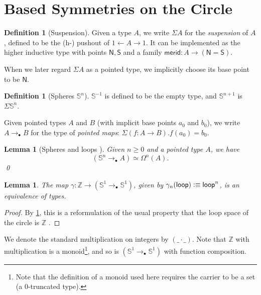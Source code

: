 \documentclass[11pt,a4paper,oneside,reqno]{amsart}
\newtheorem{lemma}[theorem]{Lemma}
\theoremstyle{definition}
\newtheorem{definition}[theorem]{Definition}
\theoremstyle{remark}
\newcommand{\Z}{\mathbb Z}
\newcommand{\sph}[1]{{\mathbb S}^{#1}}
\newcommand{\defeq}{\vcentcolon\equiv}
\newcommand{\North}{\mathsf N}
\newcommand{\South}{\mathsf S}
\newcommand{\merid}{\mathsf{merid}}
\newcommand{\pointedm}{\rightarrow_\bullet}
\newcommand{\lo}{\mathsf{loop}}
\begin{document}
\section{Based Symmetries on the Circle}

\begin{definition}[Suspension]
 Given a type $A$, we write $\Sigma A$ for the \emph{suspension} of $A$, defined to be the (h-) pushout of $1 \leftarrow A \rightarrow 1$.
 It can be implemented as the higher inductive type with points $\North, \South$ and a family $\merid : A \to (\North = \South)$.
\end{definition}

When we later regard $\Sigma A$ as a pointed type, we implicitly choose its base point to be $\North$.


\begin{definition}[Spheres $\sph n$]
 $\sph {-1}$ is defined to be the empty type, and $\sph {n+1}$ is $\Sigma \sph n$.
\end{definition}

Given pointed types $A$ and $B$ (with implicit base points $a_0$ and $b_0$), we write $A \pointedm B$ for the type of \emph{pointed maps}: $\Sigma (f : A \to B). f(a_0) = b_0$.

\begin{lemma}[{Spheres and loops \cite[iterate Lemma 6.5.4]{HoTT}}] \label{lem:sph-loops}
 Given $n \geq 0$ and a pointed type $A$, we have
 \begin{equation}
  (\sph n \pointedm A) \simeq \Omega^n(A).
 \end{equation}
 \qed
\end{lemma}

\begin{lemma}
 The map $\gamma : \Z \to (\sph 1 \pointedm \sph 1)$, given by $\gamma_n (\lo) \defeq \lo^n$, is an equivalence of types.
\end{lemma}
\begin{proof}
 By \cref{lem:sph-loops}, this is a reformulation of the usual property that the loop space of the circle is $\Z$ \cite[Chp 8.1]{HoTT}.
\end{proof}

We denote the standard multiplication on integers by $(\_ \cdot \_)$.
Note that $\Z$ with multiplication is a monoid\footnote{Note that the definition of a monoid used here requires the carrier to be a set (a $0$-truncated type).}, and so is $(\sph 1 \pointedm \sph 1)$ with function composition.
\end{document}
